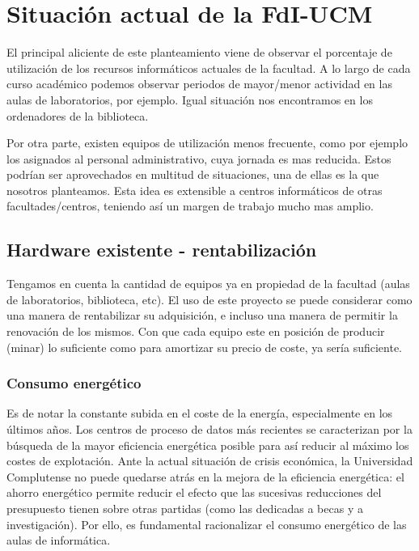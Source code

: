 \section{Situaci\'on actual de la FdI-UCM}

El principal aliciente de este planteamiento viene de observar el porcentaje de utilizaci\'on de los recursos inform\'aticos actuales de la facultad. A lo largo de cada curso acad\'emico podemos observar periodos de mayor/menor actividad en las aulas de laboratorios, por ejemplo. Igual situaci\'on nos encontramos en los ordenadores de la biblioteca.

Por otra parte, existen equipos de utilizaci\'on menos frecuente, como por ejemplo los asignados al personal administrativo, cuya jornada es mas reducida. Estos podr\'ian ser aprovechados en multitud de situaciones, una de ellas es la que nosotros planteamos. Esta idea es extensible a centros inform\'aticos de otras facultades/centros, teniendo as\'i un margen de trabajo mucho mas amplio.

\subsection{Hardware existente - rentabilizaci\'on}

Tengamos en cuenta la cantidad de equipos ya en propiedad de la facultad (aulas de laboratorios, biblioteca, etc). El uso de este proyecto se puede considerar como una manera de rentabilizar su adquisici\'on, e incluso una manera de permitir la renovaci\'on de los mismos. Con que cada equipo este en posici\'on de producir (minar) lo suficiente como para amortizar su precio de coste, ya ser\'ia suficiente.

\subsubsection{Consumo energ\'etico}

Es de notar la constante subida en el coste de la energ\'ia, especialmente en los \'ultimos a\~nos. Los centros de proceso de datos m\'as recientes se caracterizan por la b\'usqueda de la mayor eficiencia energ\'etica posible para as\'i reducir al m\'aximo los costes de explotaci\'on. Ante la actual situaci\'on de crisis econ\'omica, la Universidad Complutense no puede quedarse atr\'as en la mejora de la eficiencia energ\'etica: el ahorro energ\'etico permite reducir el efecto que las sucesivas reducciones del presupuesto tienen sobre otras partidas (como las dedicadas a becas y a investigaci\'on). Por ello, es fundamental racionalizar el consumo energ\'etico de las aulas de inform\'atica.

